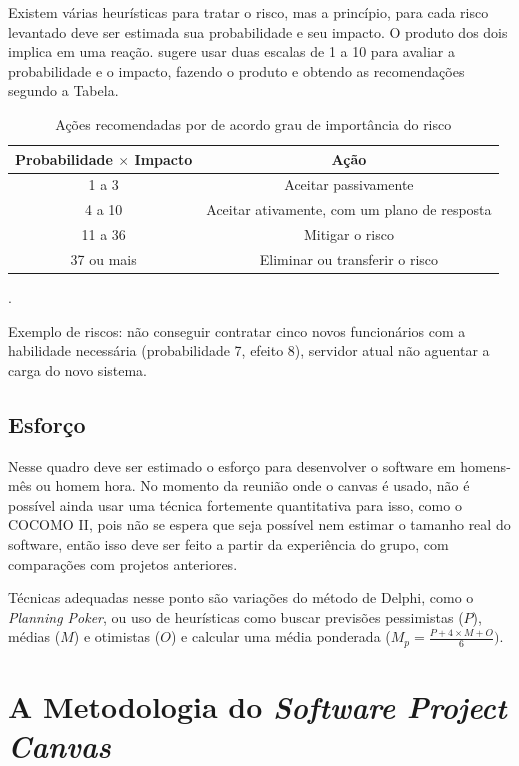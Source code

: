 \documentclass[a4]{report}
\begin{document}
Existem várias heurísticas para tratar o risco, mas a princípio, para cada risco levantado deve ser estimada sua probabilidade e seu impacto. O produto dos dois implica em uma reação. \citet{finocchio:2013} sugere usar duas escalas de 1 a 10 para avaliar a probabilidade e o impacto, fazendo o produto e obtendo as recomendações segundo a Tabela.

\begin{table}[hbt]
    \centering
    \begin{tabular}{cc}
    \toprule
     Probabilidade $\times$ Impacto    &  Ação  \\
     \midrule
         1 a 3  & Aceitar passivamente \\
         4 a 10 & Aceitar ativamente, com um plano de resposta \\
         11 a 36 & Mitigar o risco \\
         37 ou mais & Eliminar ou transferir o risco \\
    \bottomrule
    \end{tabular}
    \caption{Ações recomendadas por \citep{finocchio:2013} de acordo grau de importância do risco}.
    \label{tab:risco}
\end{table}

Exemplo de riscos: não conseguir contratar cinco novos funcionários com a habilidade necessária (probabilidade 7, efeito 8), servidor atual não aguentar a carga do novo sistema.

\subsection{Esforço}

Nesse quadro deve ser estimado o esforço para desenvolver o software em homens-mês ou homem hora. No momento da reunião onde o canvas é usado, não é possível ainda usar uma técnica fortemente quantitativa para isso, como o COCOMO II\citep{Boehm:cocomo2}, pois não se espera que seja possível nem estimar o tamanho real do software, então isso deve ser feito a partir da experiência do grupo, com comparações com projetos anteriores.

Técnicas adequadas nesse ponto são variações do método de Delphi\citep{delphi:1966}, como o \textit{Planning Poker}\citep{mike:agile:estimating}, ou uso de heurísticas como buscar previsões pessimistas ($P$), médias ($M$) e otimistas ($O$) e calcular uma média ponderada ($M_p=\frac{P+4\times M+O}{6})$\citep{pmbok:6}.

\section{A Metodologia do \textit{Software Project Canvas}}
\end{document}
